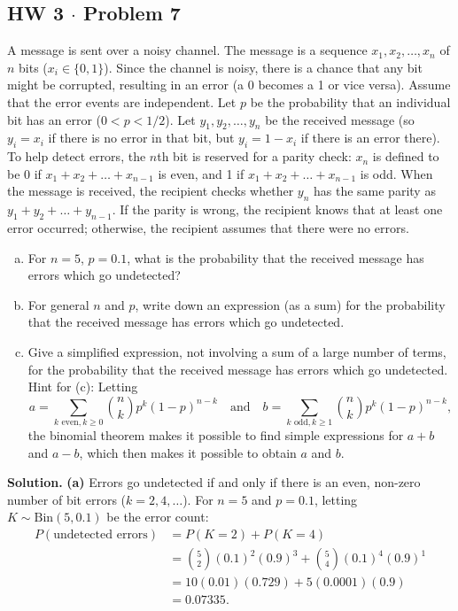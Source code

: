 \documentclass[11pt,a4paper]{article}
\begin{document}
\subsection{HW 3 $\cdot$ Problem 7}
\begin{tcolorbox}[title={HW 3 $\cdot$ Problem 7}]
A message is sent over a noisy channel. The message is a sequence $x_1, x_2, \dots, x_n$ of $n$ bits ($x_i \in \{0, 1\}$). Since the channel is noisy, there is a chance that any bit might be corrupted, resulting in an error (a 0 becomes a 1 or vice versa). Assume that the error events are independent. Let $p$ be the probability that an individual bit has an error ($0 < p < 1/2$). Let $y_1, y_2, \dots, y_n$ be the received message (so $y_i = x_i$ if there is no error in that bit, but $y_i = 1 - x_i$ if there is an error there).
To help detect errors, the $n$th bit is reserved for a parity check: $x_n$ is defined to be 0 if $x_1 + x_2 + \dots + x_{n-1}$ is even, and 1 if $x_1 + x_2 + \dots + x_{n-1}$ is odd. When the message is received, the recipient checks whether $y_n$ has the same parity as $y_1 + y_2 + \dots + y_{n-1}$. If the parity is wrong, the recipient knows that at least one error occurred; otherwise, the recipient assumes that there were no errors.
\begin{enumerate}[(a)]
\item For $n = 5$, $p = 0.1$, what is the probability that the received message has errors which go undetected?
\item For general $n$ and $p$, write down an expression (as a sum) for the probability that the received message has errors which go undetected.
\item Give a simplified expression, not involving a sum of a large number of terms, for the probability that the received message has errors which go undetected.
Hint for (c): Letting
\[
a = \sum_{k \text{ even}, k \ge 0} \binom{n}{k} p^k (1-p)^{n-k} \quad \text{and} \quad b = \sum_{k \text{ odd}, k \ge 1} \binom{n}{k} p^k (1-p)^{n-k},
\]
the binomial theorem makes it possible to find simple expressions for $a+b$ and $a-b$, which then makes it possible to obtain $a$ and $b$.
\end{enumerate}
\end{tcolorbox}

\noindent \textbf{Solution.} \textbf{(a)} Errors go undetected if and only if there is an even, non-zero number of bit errors ($k = 2, 4, \dots$). For $n = 5$ and $p = 0.1$, letting $K \sim \text{Bin}(5, 0.1)$ be the error count:
\begin{align*}
P(\text{undetected errors}) &= P(K = 2) + P(K = 4) \\
&= \binom{5}{2} (0.1)^2 (0.9)^3 + \binom{5}{4} (0.1)^4 (0.9)^1 \\
&= 10 (0.01) (0.729) + 5 (0.0001) (0.9) \\
&= 0.07335.
\end{align*}
\end{document}

